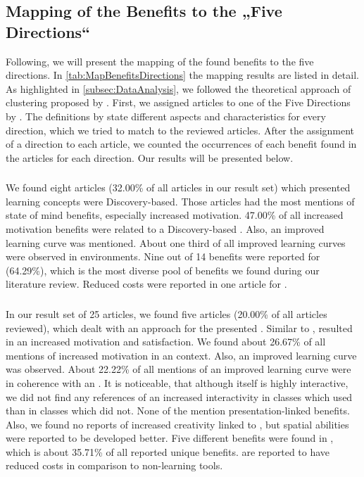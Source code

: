 \subsection{Mapping of the Benefits to the „Five Directions“}
\label{subsec:Mapping}
Following, we will present the mapping of the found benefits to the five directions. In \ref{tab:MapBenefitsDirections} the mapping results are listed in detail. \\
As highlighted in \ref{subsec:DataAnalysis}, we followed the theoretical approach of clustering proposed by \cite{Jankowicz.2004}.\autocite[cf.][149]{Jankowicz.2004} First, we assigned articles to one of the Five Directions by \cite{Yuen.2011}.\autocite[cf.][127-130]{Yuen.2011} The definitions by \cite{Yuen.2011} state different aspects and characteristics for every direction, which we tried to match to the reviewed articles. After the assignment of a direction to each article, we counted the occurrences of each benefit found in the articles for each direction. Our results will be presented below.

\subsubsection{\DBLns}
\label{subsubsec:DiscoveryBasedLearning}
We found eight articles (32.00\% of all articles in our result set) which presented learning concepts were Discovery-based. Those articles had the most mentions of state of mind benefits, especially increased motivation. 47.00\% of all increased motivation benefits were related to a Discovery-based \AR \appns. Also, an improved learning curve was mentioned. About one third of all improved learning curves were observed in \DBL environments. Nine out of 14 benefits were reported for \DBL \apps (64.29\%), which is the most diverse pool of benefits we found during our literature review. Reduced costs were reported in one article for \DBL \appsns.

\subsubsection{\OMns}
In our result set of 25 articles, we found five articles (20.00\% of all articles reviewed), which dealt with an \OM approach for the presented \AR \appns. Similar to \DBL \appsns, \OM resulted in an increased motivation and satisfaction. We found about 26.67\% of all mentions of increased motivation in an \OM context. Also, an improved learning curve was observed. About 22.22\% of all mentions of an improved learning curve were in coherence with an \OM \appns. It is noticeable, that although \OM itself is highly interactive, we did not find any references of an increased interactivity in classes which used \AR than in classes which did not. None of the \OM \apps mention presentation-linked benefits. Also, we found no reports of increased creativity linked to \OM, but spatial abilities were reported to be developed better. Five different benefits were found in \OM \appsns, which is about 35.71\% of all reported unique benefits. \OM \apps are reported to have reduced costs in comparison to non-\AR learning tools.

